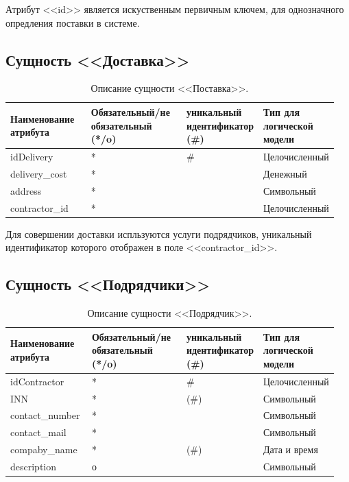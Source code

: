 \documentclass[14pt]{extreport}
\begin{document}
        Атрибут <<id>> является искуственным первичным ключем, для однозначного опредления поставки в системе.%

    
    \subsection*{Сущность <<Доставка>>}

        \begin{table}[H]
            \caption{Описание сущности <<Поставка>>.}

            \begin{tabular}{|p{0.25\linewidth}|p{0.3\linewidth}|p{0.2\linewidth}|p{0.2\linewidth}|}
                \hline
                Наименование атрибута & Обязательный/не обязательный (*/o) & уникальный идентификатор (\#) & Тип для логической модели
                \\ \hline
                idDelivery & * & \# & Целочисленный \\ \hline
                delivery\_cost & * & & Денежный\\ \hline
                address & * & & Символьный \\ \hline
                contractor\_id & * & & Целочисленный \\ \hline
            \end{tabular}
        \end{table}

        Для совершении доставки испльзуются услуги подрядчиков, уникальный идентификатор которого отображен в поле <<contractor\_id>>.

    \subsection*{Сущность <<Подрядчики>>}

        \begin{table}[H]
            \caption{Описание сущности <<Подрядчик>>.}

            \begin{tabular}{|p{0.25\linewidth}|p{0.3\linewidth}|p{0.2\linewidth}|p{0.2\linewidth}|}
                \hline
                Наименование атрибута & Обязательный/не обязательный (*/o) & уникальный идентификатор (\#) & Тип для логической модели
                \\ \hline
                idContractor & * & \# & Целочисленный \\ \hline
                INN & * & (\#) & Символьный \\ \hline
                contact\_number & * &  & Символьный\\ \hline
                contact\_mail & * & & Символьный \\ \hline
                compaby\_name & * & (\#) & Дата и время \\ \hline
                description & о & & Символьный \\ \hline
            \end{tabular}
        \end{table}
    
\end{document}
